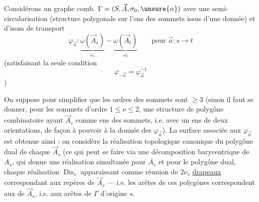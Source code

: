 
Considérons un graphe comb. $\Gamma=(S,\vec A,\sigma_0,\unsure{\alpha})$ avec une semi-circularisation (structure polygonale  sur l'ens des sommets issus d'une  donnée) et  d'isom de transport
\[
\varphi_{\vec a}:\underbrace{\omega(\vec A_s)}_{\omega_s}\mathbin{-}\underbrace{\omega(\vec A_t)}_{\omega_t}\qquad\text{pour }\vec a:s\longrightarrow t
\]
(satisfaisant la seule condition
\[
\varphi_{-\vec a}=\varphi_{\vec a}^{-1}
\]
)

On suppose pour simplifier que les ordres des sommets sont $\ge3$ (sinon il faut se donner, pour les sommets d'ordre $1\le\nu\le2$, une structure de polygône combinatoire ayant $\vec A_s$ comme ens des sommets, i.e. avec un ens de deux orientations, de façon à pouvoir  à la donnée des $\varphi_{\vec a}$). La surface associée aux $\varphi_{\vec a}$ est obtenue ainsi : on considère la réalisation topologique canonique  du polygône dual de chaque $\vec A_s$ (ce qui peut se faire via une décomposition barycentrique de $\overline A_s$, qui donne une réalisation simultanée pour  $\overline A_s$ et pour le polygône dual, chaque réalisation $\operatorname{Dis}_s$ apparaissant comme réunion de $2\nu_s$ \uline{drapeaux} correspondant aux repères de $\vec A_s$ --- i.e. les arêtes de ces polygônes correspondent aux   de $\vec A_s$, i.e. aux arêtes  de $\Gamma$  d'origine $s$.


